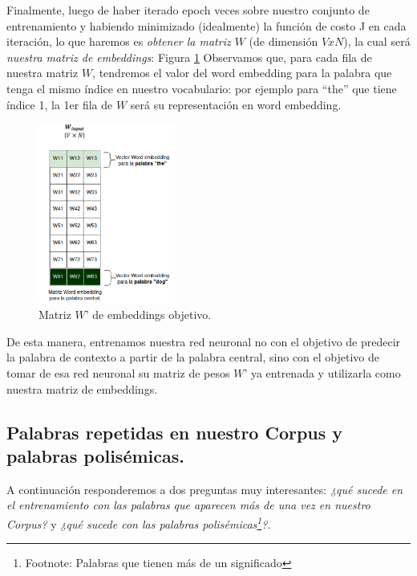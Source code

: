 \documentclass[12pt,a4paper]{article}
\begin{document}
\begin{sloppypar}
\begin{enumerate}
\end{enumerate}
      
Finalmente, luego de haber iterado epoch veces sobre nuestro conjunto de entrenamiento y habiendo minimizado (idealmente) la función de costo J en cada iteración, lo que haremos es \textit{obtener la matriz $W$} (de dimensión $V x N$), la cual será \textit{nuestra matriz de embeddings}: Figura \ref{fig:9_EjSkip} Observamos que, para cada fila de nuestra matriz $W$, tendremos el valor del word embedding para la palabra que tenga el mismo índice en nuestro vocabulario: por ejemplo para “the” que tiene índice 1, la 1er fila de $W$ será su representación en word embedding.

\begin{figure}[H]    %
\centering
\includegraphics[width=0.4\textwidth]{images/Ejemplo_Skipgram/9_EjSkip.png}
\caption{Matriz $W’$ de embeddings objetivo.} 
\label{fig:9_EjSkip}
\end{figure}

De esta manera, entrenamos nuestra red neuronal no con el objetivo de predecir la palabra de contexto a partir de la palabra central, sino con el objetivo de tomar de esa red neuronal su matriz de pesos $W’$ ya entrenada y utilizarla como nuestra matriz de embeddings.


\cleardoublepage

\subsection{Palabras repetidas en nuestro Corpus y palabras polisémicas.}\label{anexo_polisem}

A continuación responderemos a dos preguntas muy interesantes: \textit{¿qué sucede en el entrenamiento con las palabras que aparecen más de una vez en nuestro Corpus?} y \textit{¿qué sucede con las palabras polisémicas\footnote{Footnote: Palabras que tienen más de un significado}?}.


\end{sloppypar}
\end{document}
